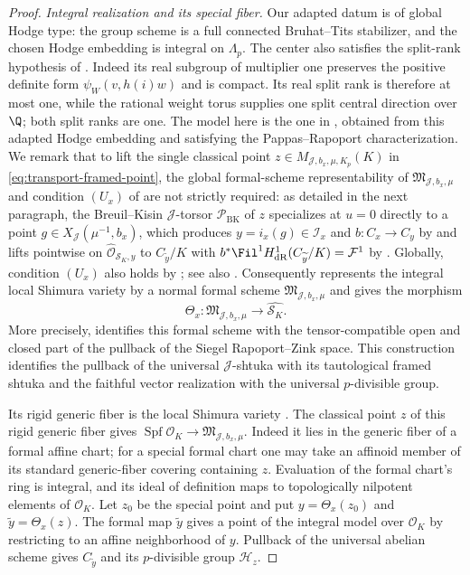 \begin{proof}
\medskip\noindent
\emph{Integral realization and its special fiber.}
Our adapted datum is of global Hodge type: the group scheme is
a full connected Bruhat--Tits stabilizer, and the chosen Hodge
embedding is integral on $\Lambda_p$.
The center also satisfies the split-rank hypothesis of
\cite[\S4.1]{PappasRapoport2024}.  Indeed its real subgroup of
multiplier one preserves the positive definite form
$\psi_W(v,h(i)w)$ and is compact.  Its real split rank is
therefore at most one, while the rational weight torus supplies
one split central direction over $\Q$; both split ranks are one.
The model here is the one in
\cite[\S2.1.11 and Theorem~2.1.12]{KisinZhou2025}, obtained
from this adapted Hodge embedding and satisfying the
Pappas--Rapoport characterization.  We remark that to lift the
single classical point $z\in M_{\mathcal J,b_x,\mu,K_p}(K)$ in
\eqref{eq:transport-framed-point}, the global formal-scheme
representability of $\mathfrak M_{\mathcal J,b_x,\mu}$ and
condition $(U_x)$ of \cite[Corollary~6.3]{GleasonLimXu2026} are
not strictly required: as detailed in the next paragraph, the
Breuil--Kisin $\mathcal J$-torsor $\mathcal P_{\mathrm{BK}}$ of
$z$ specializes at $u=0$ directly to a point
$g\in X_{\mathcal J}(\mu^{-1},b_x)$, which produces
$y=i_x(g)\in\mathcal I_x$ and $b:C_x\to C_y$ by
\cite[Theorem~2.2.5]{KisinZhou2025} and lifts pointwise on
$\widehat{\mathcal O}_{\mathcal S_K,y}$ to $C_{\widetilde y}/K$
with $b^*\Fil^1H^1_{\mathrm{dR}}(C_{\widetilde y}/K)=\mathcal F^1$
by \cite[Proposition~2.2.3]{KisinZhou2025}.  Globally, condition
$(U_x)$ also holds by \cite[Corollary~6.3]{GleasonLimXu2026}; see
also \cite[Remark~4.10.4]{PappasRapoport2024}.  Consequently
\cite[Theorem~4.10.6]{PappasRapoport2024} represents the integral
local Shimura variety by a normal formal scheme
$\mathfrak M_{\mathcal J,b_x,\mu}$ and gives the morphism
\[
 \Theta_x:\mathfrak M_{\mathcal J,b_x,\mu}
          \longrightarrow\widehat{\mathcal S_K}.
\]
More precisely, \cite[\S4.10.2, (4.10.2)--(4.10.6)]{PappasRapoport2024}
identifies this formal scheme with the tensor-compatible open and
closed part of the pullback of the Siegel Rapoport--Zink space.
This construction identifies the pullback of the universal
$\mathcal J$-shtuka with its tautological framed shtuka and the
faithful vector realization with the universal $p$-divisible group.

Its rigid generic fiber is the local Shimura variety
\cite[Proposition~3.5.1(i)]{PappasRapoport2024}.
The classical point $z$ of this rigid generic fiber gives
$\operatorname{Spf}\mathcal O_K\to\mathfrak M_{\mathcal J,b_x,\mu}$.
Indeed it lies in the generic fiber of a formal affine chart;
for a special formal chart one may take an affinoid member of
its standard generic-fiber covering containing $z$.
Evaluation of the formal chart's ring is integral, and its
ideal of definition maps to topologically nilpotent elements of
$\mathcal O_K$.  Let $z_0$ be the special point and put
$y=\Theta_x(z_0)$ and $\widetilde y=\Theta_x(z)$.
The formal map $\widetilde y$ gives a point of the integral model
over $\mathcal O_K$ by restricting to an affine neighborhood of
$y$.  Pullback of the universal abelian scheme gives
$C_{\widetilde y}$ and its $p$-divisible group $\mathcal H_z$.


\end{proof}
